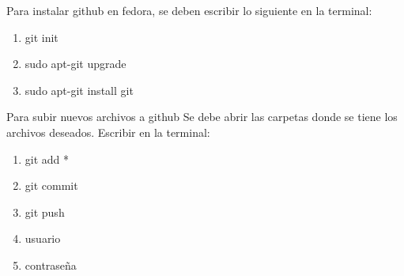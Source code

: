 \documentclass[letterpaper, 12pt, oneside]{article}%
\begin{document}
\begin{enumerate}
\begin{enumerate}
	\end{enumerate}
Para instalar github en fedora, se deben escribir lo siguiente en la terminal: 
\begin{enumerate}
	\item git init
	\item sudo apt-git upgrade
	\item sudo apt-git install git
\end{enumerate}


Para subir nuevos archivos a github
Se debe abrir las carpetas donde se tiene los archivos deseados. 
Escribir en la terminal:
\begin{enumerate}
	\item git add *
	\item git commit
	\item git push
	\item usuario
	\item contraseña
\end{enumerate}

\end{enumerate}
\end{document}
